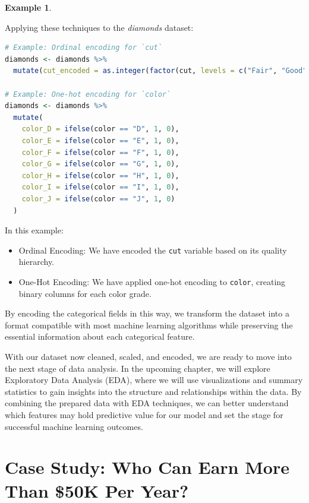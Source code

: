 \documentclass[
  11pt,
]{book}
\newcommand{\passthrough}[1]{#1}
\providecommand{\tightlist}{%
  \setlength{\itemsep}{0pt}\setlength{\parskip}{0pt}}
\theoremstyle{definition}
\theoremstyle{definition}
\newtheorem{example}{Example}[chapter]
\theoremstyle{definition}
\theoremstyle{definition}
\theoremstyle{remark}
\begin{document}
\begin{example}
\protect\hypertarget{exm:ex-encoding}{}\label{exm:ex-encoding}

Applying these techniques to the \emph{diamonds} dataset:

\begin{lstlisting}[language=R]
# Example: Ordinal encoding for `cut`
diamonds <- diamonds %>%
  mutate(cut_encoded = as.integer(factor(cut, levels = c("Fair", "Good", "Very Good", "Premium", "Ideal"))))

# Example: One-hot encoding for `color`
diamonds <- diamonds %>%
  mutate(
    color_D = ifelse(color == "D", 1, 0),
    color_E = ifelse(color == "E", 1, 0),
    color_F = ifelse(color == "F", 1, 0),
    color_G = ifelse(color == "G", 1, 0),
    color_H = ifelse(color == "H", 1, 0),
    color_I = ifelse(color == "I", 1, 0),
    color_J = ifelse(color == "J", 1, 0)
  )
\end{lstlisting}

In this example:

\begin{itemize}
\tightlist
\item
  Ordinal Encoding: We have encoded the \passthrough{\lstinline!cut!} variable based on its quality hierarchy.
\item
  One-Hot Encoding: We have applied one-hot encoding to \passthrough{\lstinline!color!}, creating binary columns for each color grade.
\end{itemize}

\end{example}

By encoding the categorical fields in this way, we transform the dataset into a format compatible with most machine learning algorithms while preserving the essential information about each categorical feature.

With our dataset now cleaned, scaled, and encoded, we are ready to move into the next stage of data analysis. In the upcoming chapter, we will explore Exploratory Data Analysis (EDA), where we will use visualizations and summary statistics to gain insights into the structure and relationships within the data. By combining the prepared data with EDA techniques, we can better understand which features may hold predictive value for our model and set the stage for successful machine learning outcomes.

\section{Case Study: Who Can Earn More Than \$50K Per Year?}\label{Data-pre-adult}
\end{document}
